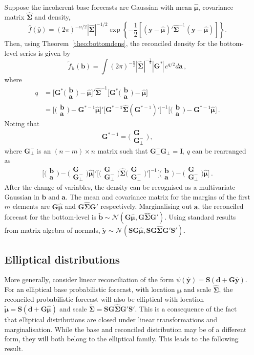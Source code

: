 \documentclass[11pt]{article}
\def\PQ{\bigg(\begin{matrix}\bm{G}\\[-0.2cm]\bm{G}_{\perp}^-\end{matrix}\bigg)}
\def\bt{\bigg(\begin{matrix}\bm{b}\\[-0.2cm]\bm{a}\end{matrix}\bigg)}
\theoremstyle{definition}
\begin{document}
Suppose the incoherent base forecasts are Gaussian with mean $\hat{\bm{\mu}}$, covariance matrix $\hat{\bm{\Sigma}}$ and density,
\begin{equation}
\hat{f}(\hat{y})=(2\pi)^{-n/2}|\hat{\bm{\Sigma}}|^{-1/2}\exp\left\{-\frac{1}{2}\left[({\bm{y}}-\hat{\bm{\mu}})'\hat{\bm{\Sigma}}^{-1}({\bm{y}}-\hat{\bm{\mu}})\right]\right\}\nonumber.
\end{equation}
Then, using Theorem~\ref{theo:bottomdens}, the reconciled density for the bottom-level series is given by
\begin{equation}
\tilde{f}_{\bm{b}}(\bm{b})=\int(2\pi)^{-\frac{n}{2}}|\hat{\bm{\Sigma}}|^{-\frac{1}{2}}|\bm{G}^*|e^{q/2} d\bm{a}\nonumber\,,
\end{equation}
where
\begin{align*}
	q& =
	\bigg[\bm{G}^*\bt-\hat{\bm{\mu}}\bigg]' \hat{\bm{\Sigma}}^{-1}\bigg[\bm{G}^*\bt-\hat{\bm{\mu}}\bigg]\\
	& =
	\bigg[\bt-\bm{G}^{*-1}\hat{\bm{\mu}}\bigg]'
  \bigg[\bm{G}^{*-1}\hat{\bm{\Sigma}}(\bm{G}^{*-1})'\bigg]^{-1}
	\bigg[\bt-\bm{G}^{*-1}\hat{\bm{\mu}}\bigg]\,.
\end{align*}
Noting that
\[
\bm{G}^{*-1}=\Bigg(\begin{matrix}
\bm{G} \\\bm{G}_{\perp}^-
\end{matrix}\Bigg)\,,
\]
where $\bm{G}_{\perp}^-$ is an $(n-m)\times n$ matrix such that $\bm{G}_{\perp}^-\bm{G}_{\perp}=\bm{I}$, $q$ can be rearranged as
\[
 \bigg[\bt-\PQ\hat{\bm{\mu}}\bigg]'
 \bigg[\PQ\hat{\bm{\Sigma}}\PQ'\bigg]^{-1}
 \bigg[\bt-\PQ\hat{\bm{\mu}}\bigg]\,.
\]
After the change of variables, the density can be recognised as a multivariate Gaussian in $\bm{b}$ and $\bm{a}$. The mean and covariance matrix for the margins of the first $m$ elements are $\bm{G}\hat{\bm{\mu}}$ and $\bm{G}\hat{\bm{\Sigma}}\bm{G}'$ respectively. Marginalising out $\bm{a}$, the reconciled forecast for the bottom-level is $\tilde{\bm{b}} \sim \mathcal{N}(\bm{G}\hat{\bm{\mu}}, \bm{G}\hat{\bm{\Sigma}}\bm{G}')$. Using standard results from matrix algebra of normals, $\tilde{\bm{y}} \sim \mathcal{N}(\bm{S}\bm{G}\hat{\bm{\mu}}, \bm{S}\bm{G}\hat{\bm{\Sigma}}\bm{G}'\bm{S}')$.

\subsection{Elliptical distributions}\label{sec:elliptical}

More generally, consider linear reconciliation of the form $\psi(\hat{\bm{y}})=\bm{S}(\bm{d}+\bm{G}\hat{\bm{y}})$. For an elliptical base probabilistic forecast, with location $\hat{\bm\mu}$ and scale $\hat{\bm\Sigma}$, the reconciled probabilistic forecast will also be elliptical with location $\tilde{\bm{\mu}}=\bm{S}(\bm{d}+\bm{G}\hat{\bm{\mu}})$ and scale $\tilde{\bm{\Sigma}}=\bm{S}\bm{G}\hat{\bm{\Sigma}}\bm{G}'\bm{S}'$. This is a consequence of the fact that elliptical distributions are closed under linear transformations and marginalisation. While the base and reconciled distribution may be of a different form, they will both belong to the elliptical family. This leads to the following result.
\end{document}
